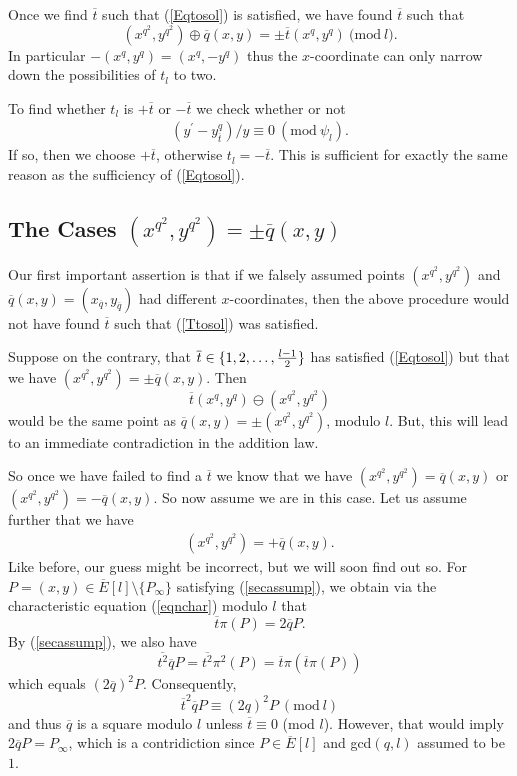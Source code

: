 \documentclass{article}
\begin{document}
Once we find $\overline{t}$ such that (\ref{Eqtosol}) is satisfied, we have found $\overline{t}$ such that
$$(x^{q^2},y^{q^2}) \oplus \overline{q}(x,y) = \pm \overline{t}(x^q,y^q) \mathrm{~(mod~}l).$$
In particular $-(x^q,y^q) = (x^q,-y^q)$ thus the $x$-coordinate can
only narrow down the possibilities of $t_l$ to two.

To find whether $t_l$ is $+\overline{t}$ or $-\overline{t}$ we check
whether or not
\begin{eqnarray} (y^\prime - y^q_{\overline{t}})/y \equiv 0 ~(\mathrm{mod~}\psi_l).\end{eqnarray}
If so, then we choose $+\overline{t}$, otherwise $t_l =
-\overline{t}$. This is sufficient for exactly the same reason as
the sufficiency of (\ref{Eqtosol}).

\subsection{The Cases  $(x^{q^2},y^{q^2})  = \pm\overline{q}(x,y)$}
\label{DecCases}

Our first important assertion is that if we falsely assumed points $(x^{q^2},y^{q^2})$ and 
$\overline{q}(x,y) = (x_{\overline{q}},y_{\overline{q}})$ had different 
$x$-coordinates, then the above procedure would not have found $\overline{t}$ such that (\ref{Ttosol}) was satisfied.  

Suppose on the contrary, that $\overline{t} \in \{1,2,\dots, {l-1\over 2}\}$ has satisfied (\ref{Eqtosol}) but that we have 
$(x^{q^2},y^{q^2})  = \pm\overline{q}(x,y)$.  Then 
$$\overline{t}(x^q,y^q)\ominus (x^{q^2},y^{q^2})$$ would be the same point as $\overline{q}(x,y) = \pm (x^{q^2},y^{q^2})$, modulo $l$.  But, this will 
lead to an immediate contradiction in the addition law.

So once we have failed to find a $\overline{t}$ we know that we have  $(x^{q^2},y^{q^2})  = \overline{q}(x,y)$ or 
$(x^{q^2},y^{q^2})  = -\overline{q}(x,y)$.  So now assume we are in this case.
Let us assume further that we have \begin{eqnarray} \label{secassump} (x^{q^2},y^{q^2})  = +\overline{q}(x,y).\end{eqnarray}  
Like before, our guess might be incorrect, but we will soon find out so.  
For $P = (x,y) \in \overline{E}[l]\setminus\{P_\infty\}$ satisfying (\ref{secassump}), 
we obtain via the characteristic equation (\ref{eqnchar}) modulo $l$ that 
$$\overline{t}\pi(P) = 2\overline{q}P.$$ By (\ref{secassump}), we also have $$\overline{t^2}\overline{q}P=\overline{t^2}\pi^2(P) = 
\overline{t}\pi(\overline{t}\pi(P))$$ which equals 
$(2\overline{q})^2P$.  Consequently, $$\overline{t}^2\overline{q}P \equiv (2q)^2P ~(\mathrm{mod~}l)$$ and thus $\overline{q}$ is a square modulo $l$ 
unless $\overline{t} \equiv 0 $ (mod $l$).  However, that would imply $2\overline{q}P = P_\infty$, which is a contridiction since $P \in \overline{E}[l]$ 
and gcd$(q,l)$ assumed to be $1$.
\end{document}
